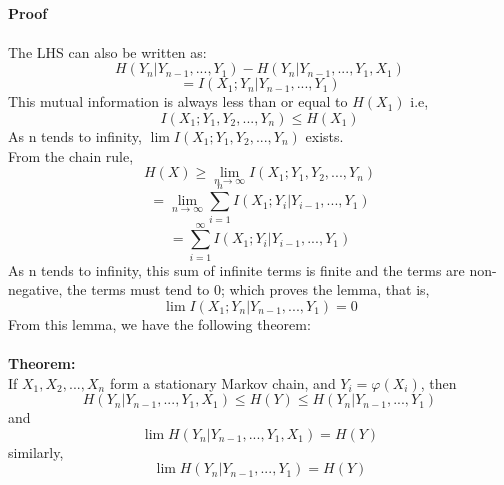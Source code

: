 \documentclass[10pt,twocolumn,letterpaper]{article}
\begin{document}
\\ \textbf{Proof}\\
\\The LHS can also be written as:
\begin{equation*}
     H (Y_n |Y_{n-1} , . . . , Y_1 ) - H (Y_n |Y_{n-1} , . . . , Y_1 , X_1 )
\end{equation*}
\begin{equation*}
    = I (X_1 ; Y_n |Y_{n-1}, . . . , Y_1 )
\end{equation*}
This mutual information is always less than or equal to \begin{math}
H(X_1) \end{math} i.e, 
\begin{equation*}
    I (X_1 ; Y_1 ,Y_2 , . . . , Y_n  ) \leq H(X_1)
\end{equation*} 
As n tends to infinity, \begin{math}\lim I (X_1 ; Y_1 ,Y_2 , . . . , Y_n ) \end{math}
exists.\\ From the chain rule, 
\begin{equation*}
    H (X) \geq \lim_{n \to \infty} I (X_1 ; Y_1 , Y_2 , . . . , Y_n )
\end{equation*}
\begin{equation*}
    = \lim_{n \to \infty} \sum_{i=1}^{n} I (X_1 ; Y_i |Y_{i-1} , . . . , Y_1 )
\end{equation*}
\begin{equation*}
    = \sum_{i=1}^{\infty} I (X_1 ; Y_i |Y_{i-1} , . . . , Y_1 )
\end{equation*}
As n tends to infinity, this sum of infinite terms is ﬁnite and the terms are non-negative, the terms must tend to 0; which proves the lemma, that is,
\begin{equation*}
    \lim I (X_1 ; Y_n |Y_{n-1} , . . . , Y_1 ) = 0
\end{equation*}
From this lemma, we have the following theorem:\\
\\ \textbf{Theorem:}\\
If \begin{math} X_1 , X_2 , . . . , X_n \end{math} form a stationary Markov chain, and
\begin{math} Y_i = \varphi(X_i ) \end{math}, then 
\begin{equation*}
    H (Y_n |Y_{n-1} , . . . , Y_1 , X_1 ) \leq H ( Y ) \leq H (Y_n |Y_{n-1} , . . . , Y_1 )
\end{equation*}
and
\begin{equation*}
   \lim H (Y_n |Y_{n-1} , . . . , Y_1 , X_1 ) = H ( Y ) 
\end{equation*}
similarly, 
\begin{equation*}
    \lim H (Y_n |Y_{n-1} , . . . , Y_1 ) = H(Y)
\end{equation*}
\begin{math}

\end{math}
\end{document}
